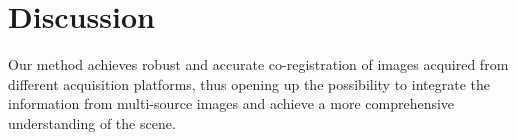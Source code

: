 \section{Discussion}
\label{sec:disc}

Our method achieves robust and accurate co-registration of images acquired from different acquisition platforms, thus opening up the possibility to integrate the information from multi-source images and achieve a more comprehensive understanding of the scene.
